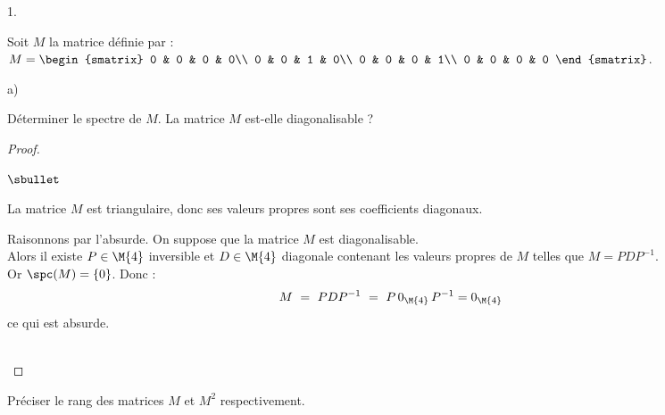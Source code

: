\documentclass[11pt]{article}%
\begin{document}
\begin{noliste}{1.}
  \setlength{\itemsep}{4mm}
  \item Soit $M$ la matrice définie par : 
  $M = \begin{smatrix}
    0 & 0 & 0 & 0\\
    0 & 0 & 1 & 0\\
    0 & 0 & 0 & 1\\
    0 & 0 & 0 & 0
  \end{smatrix}$.
  \begin{noliste}{a)}
    \setlength{\itemsep}{2mm}
    \item Déterminer le spectre de $M$. La matrice $M$ est-elle 
    diagonalisable ?
    
    \begin{proof}~
      \begin{noliste}{$\sbullet$}
	\item La matrice $M$ est triangulaire, donc ses valeurs propres
	sont ses coefficients diagonaux.
	
	\item Raisonnons par l'absurde.
	On suppose que la matrice $M$ est diagonalisable.\\
	Alors il existe $P \in \M{4}$ inversible et $D \in \M{4}$ 
	diagonale contenant les valeurs propres de $M$ telles que 
	$M=PDP^{-1}$.\\
	Or $\spc(M)=\{0\}$. Donc :
	\[
	  M \ = \ PDP^{-1} \ = \ P \, 0_{\M{4}} \, P^{-1} = 0_{\M{4}}
	\]
	ce qui est absurde.
      \end{noliste}
      
      ~\\[-1.4cm]
    \end{proof}

    
    \item Préciser le rang des matrices $M$ et $M^2$ respectivement.
    

\end{noliste}
\end{noliste}
\end{document}
